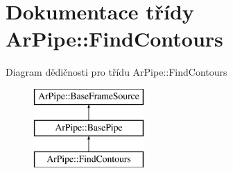 \hypertarget{class_ar_pipe_1_1_find_contours}{\section{Dokumentace třídy Ar\-Pipe\-:\-:Find\-Contours}
\label{db/db3/class_ar_pipe_1_1_find_contours}
}
Diagram dědičnosti pro třídu Ar\-Pipe\-:\-:Find\-Contours\begin{figure}[H]
\begin{center}
\leavevmode
\includegraphics[height=3.000000cm]{db/db3/class_ar_pipe_1_1_find_contours}
\end{center}
\end{figure}
